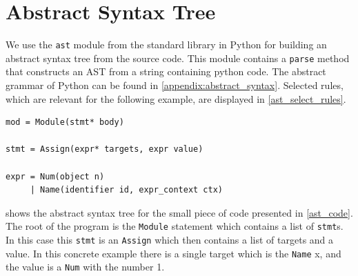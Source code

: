 \section{Abstract Syntax Tree}\label{library:ast}
We use the \texttt{ast} module from the standard library in Python for building an abstract syntax tree from the source code.
This module contains a \texttt{parse} method that constructs an AST from a string containing python code.
The abstract grammar of Python can be found in \cref{appendix:abstract_syntax}.
Selected rules, which are relevant for the following example, are displayed in \cref{ast_select_rules}.

\begin{lstlisting}[style=default, caption={Selected rules from the python abstract grammar}, label={ast_select_rules}]
mod = Module(stmt* body)

stmt = Assign(expr* targets, expr value)

expr = Num(object n)
     | Name(identifier id, expr_context ctx)
\end{lstlisting}

 shows the abstract syntax tree for the small piece of code presented in \cref{ast_code}.
The root of the program is the \texttt{Module} statement which contains a list of \texttt{stmt}s.
In this case this \texttt{stmt} is an \texttt{Assign} which then contains a list of targets and a value.
In this concrete example there is a single target which is the \texttt{Name} x, and the value is a \texttt{Num} with the number 1.

